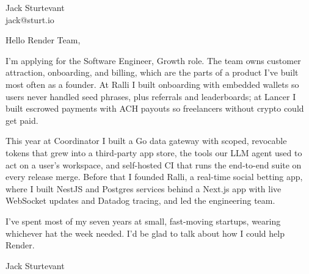 \documentclass[11pt]{article}
\begin{document}
\raggedright

{\namefont\fontsize{20pt}{24pt}\selectfont Jack Sturtevant}\\[-0.3em]
jack@sturt.io

\vspace{1.2em}

Hello Render Team,

I'm applying for the Software Engineer, Growth role. The team owns customer attraction, onboarding, and billing, which are the parts of a product I've built most often as a founder. At Ralli I built onboarding with embedded wallets so users never handled seed phrases, plus referrals and leaderboards; at Lancer I built escrowed payments with ACH payouts so freelancers without crypto could get paid.

This year at Coordinator I built a Go data gateway with scoped, revocable tokens that grew into a third-party app store, the tools our LLM agent used to act on a user's workspace, and self-hosted CI that runs the end-to-end suite on every release merge. Before that I founded Ralli, a real-time social betting app, where I built NestJS and Postgres services behind a Next.js app with live WebSocket updates and Datadog tracing, and led the engineering team.

I've spent most of my seven years at small, fast-moving startups, wearing whichever hat the week needed. I'd be glad to talk about how I could help Render.

\vspace{0.6em}
Jack Sturtevant
\end{document}
